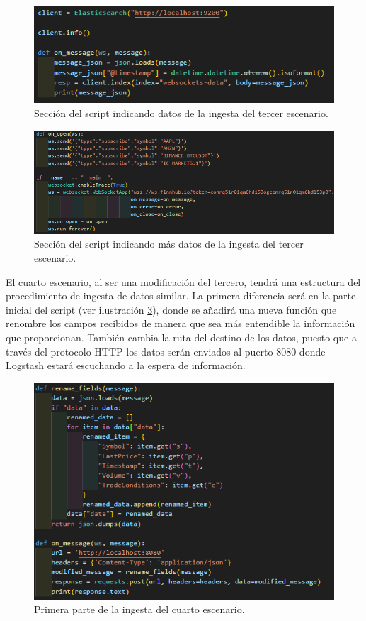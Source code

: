 \begin{figure}
    \centering
    \includegraphics[width=1\linewidth]{img/ingesta31.png}
    \caption{Sección del script indicando datos de la ingesta del tercer escenario.}
    \label{fig:ingesta31}
\end{figure}
\begin{figure}
    \centering
    \includegraphics[width=1\linewidth]{img/ingesta32.png}
    \caption{Sección del script indicando más datos de la ingesta del tercer escenario.}
    \label{fig:ingesta32}
\end{figure}

El cuarto escenario, al ser una modificación del tercero, tendrá una estructura del procedimiento de ingesta de datos similar. La primera diferencia será en la parte inicial del script  (ver ilustración  \ref{fig:ingesta41}), donde se añadirá una nueva función que renombre los campos recibidos de manera que sea más entendible la información que proporcionan. También cambia la ruta del destino de los datos, puesto que a través del protocolo HTTP los datos serán enviados al puerto 8080 donde Logstash estará escuchando a la espera de información.

\begin{figure}
    \centering
    \includegraphics[width=1\linewidth]{img/ingesta41.png}
    \caption{Primera parte de la ingesta del cuarto escenario.}
    \label{fig:ingesta41}
\end{figure}

